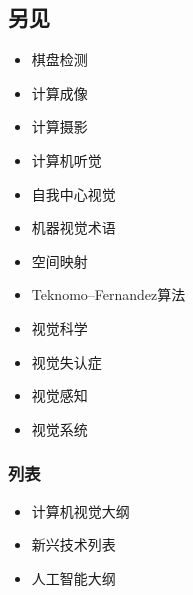 \subsection{另见}  
\begin{itemize}
\item 棋盘检测  
\item 计算成像  
\item 计算摄影  
\item 计算机听觉  
\item 自我中心视觉  
\item 机器视觉术语  
\item 空间映射  
\item Teknomo–Fernandez算法  
\item 视觉科学  
\item 视觉失认症  
\item 视觉感知  
\item 视觉系统  
\end{itemize}
\subsubsection{列表}  
\begin{itemize}
\item 计算机视觉大纲  
\item 新兴技术列表  
\item 人工智能大纲
\end{itemize}

